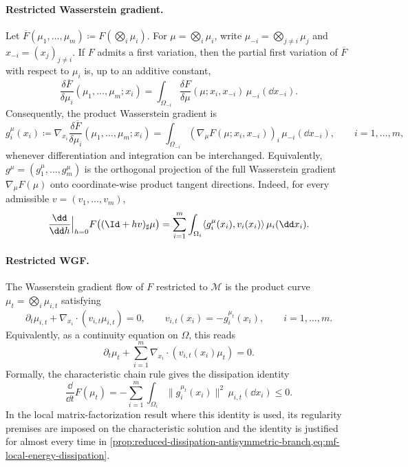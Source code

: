 \paragraph{Restricted Wasserstein gradient.}
Let $\overline F(\mu_1,\ldots,\mu_m)\coloneqq F(\bigotimes_i\mu_i)$.  For
$\mu=\bigotimes_i\mu_i$, write $\mu_{-i}=\bigotimes_{j\neq i}\mu_j$ and
$x_{-i}=(x_j)_{j\neq i}$.  If $F$ admits a first variation, then the partial first
variation of $\overline F$ with respect to $\mu_i$ is, up to an additive constant,
\begin{equation}
    \frac{\delta \overline F}{\delta \mu_i}(\mu_1,\ldots,\mu_m;x_i)
    =
    \int_{\Omega_{-i}}
    \frac{\delta F}{\delta\mu}(\mu;x_i,x_{-i})\,\mu_{-i}(\dd x_{-i}).
\end{equation}
Consequently, the product Wasserstein gradient is
\begin{equation}
    g_i^\mu(x_i)
    \coloneqq
    \nabla_{x_i}\frac{\delta \overline F}{\delta \mu_i}(\mu_1,\ldots,\mu_m;x_i)
    =
    \int_{\Omega_{-i}}
    \left(\nabla_\mu F(\mu;x_i,x_{-i})\right)_i\,\mu_{-i}(\dd x_{-i}),
    \qquad i=1,\ldots,m,
\end{equation}
whenever differentiation and integration can be interchanged.  Equivalently,
$g^\mu=(g_1^\mu,\ldots,g_m^\mu)$ is the orthogonal projection of the full Wasserstein
gradient $\nabla_\mu F(\mu)$ onto coordinate-wise product tangent directions.
Indeed, for every admissible $v=(v_1,\ldots,v_m)$,
\begin{equation}
    \frac{\dd}{\dd h}\Big|_{h=0}F\bigl((\Id+h v)_\sharp\mu\bigr)
    =
    \sum_{i=1}^m \int_{\Omega_i}\langle g_i^\mu(x_i),v_i(x_i)\rangle\,\mu_i(\dd x_i).
\end{equation}

\paragraph{Restricted WGF.}
The Wasserstein gradient flow of $F$ restricted to $\mathcal M$ is the product curve
$\mu_t=\bigotimes_i\mu_{i,t}$ satisfying
\begin{equation}
    \partial_t\mu_{i,t}
    + \nabla_{x_i}\cdot\left(v_{i,t}\mu_{i,t}\right)=0,
    \qquad
    v_{i,t}(x_i)=-g_i^{\mu_t}(x_i),
    \qquad i=1,\ldots,m .
\end{equation}
Equivalently, as a continuity equation on $\Omega$, this reads
\begin{equation}
    \partial_t\mu_t
    + \sum_{i=1}^m \nabla_{x_i}\cdot\left(v_{i,t}(x_i)\mu_t\right)=0.
\end{equation}
Formally, the characteristic chain rule gives the dissipation identity
\begin{equation}
    \frac{\dd}{\dd t}F(\mu_t)
    =
    -\sum_{i=1}^m \int_{\Omega_i}\|g_i^{\mu_t}(x_i)\|^2\,\mu_{i,t}(\dd x_i)
    \le 0.
\end{equation}
In the local matrix-factorization result where this identity is used, its
regularity premises are imposed on the characteristic solution and the
identity is justified for almost every time in
\cref{prop:reduced-dissipation-antisymmetric-branch,eq:mf-local-energy-dissipation}.
